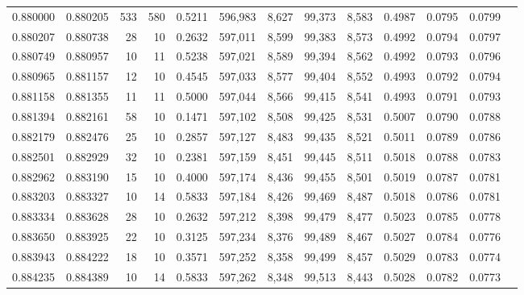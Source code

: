 \begin{tabular}{rrrrrrrrrrrrr}
0.880000 & 0.880205 &   533 & 580 &                                     0.5211 & 596,983 &   8,627 &  99,373 &   8,583 & 0.4987 & 0.0795 & 0.0799 \\
0.880207 & 0.880738 &    28 &  10 &                                     0.2632 & 597,011 &   8,599 &  99,383 &   8,573 & 0.4992 & 0.0794 & 0.0797 \\
0.880749 & 0.880957 &    10 &  11 &                                     0.5238 & 597,021 &   8,589 &  99,394 &   8,562 & 0.4992 & 0.0793 & 0.0796 \\
0.880965 & 0.881157 &    12 &  10 &                                     0.4545 & 597,033 &   8,577 &  99,404 &   8,552 & 0.4993 & 0.0792 & 0.0794 \\
0.881158 & 0.881355 &    11 &  11 &                                     0.5000 & 597,044 &   8,566 &  99,415 &   8,541 & 0.4993 & 0.0791 & 0.0793 \\
0.881394 & 0.882161 &    58 &  10 &                                     0.1471 & 597,102 &   8,508 &  99,425 &   8,531 & 0.5007 & 0.0790 & 0.0788 \\
0.882179 & 0.882476 &    25 &  10 &                                     0.2857 & 597,127 &   8,483 &  99,435 &   8,521 & 0.5011 & 0.0789 & 0.0786 \\
0.882501 & 0.882929 &    32 &  10 &                                     0.2381 & 597,159 &   8,451 &  99,445 &   8,511 & 0.5018 & 0.0788 & 0.0783 \\
0.882962 & 0.883190 &    15 &  10 &                                     0.4000 & 597,174 &   8,436 &  99,455 &   8,501 & 0.5019 & 0.0787 & 0.0781 \\
0.883203 & 0.883327 &    10 &  14 &                                     0.5833 & 597,184 &   8,426 &  99,469 &   8,487 & 0.5018 & 0.0786 & 0.0781 \\
0.883334 & 0.883628 &    28 &  10 &                                     0.2632 & 597,212 &   8,398 &  99,479 &   8,477 & 0.5023 & 0.0785 & 0.0778 \\
0.883650 & 0.883925 &    22 &  10 &                                     0.3125 & 597,234 &   8,376 &  99,489 &   8,467 & 0.5027 & 0.0784 & 0.0776 \\
0.883943 & 0.884222 &    18 &  10 &                                     0.3571 & 597,252 &   8,358 &  99,499 &   8,457 & 0.5029 & 0.0783 & 0.0774 \\
0.884235 & 0.884389 &    10 &  14 &                                     0.5833 & 597,262 &   8,348 &  99,513 &   8,443 & 0.5028 & 0.0782 & 0.0773 \\

\end{tabular}
